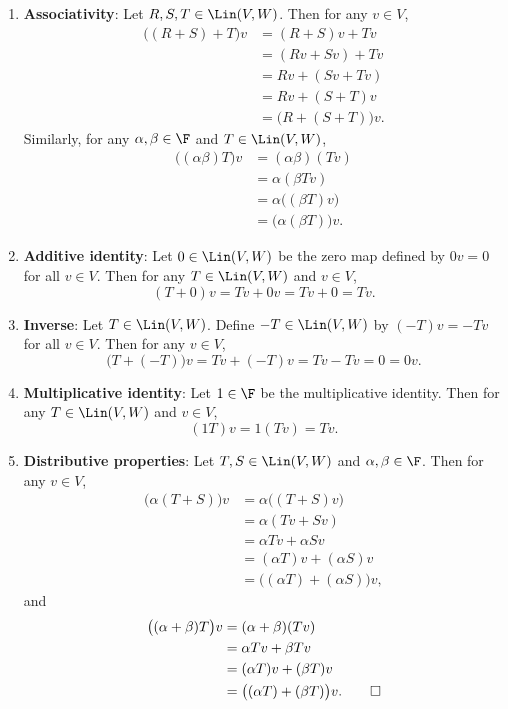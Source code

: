\begin{exc}
\begin{solution}
\begin{enumerate}[label=\arabic*)]
\begin{align*}
    &= (T+S)v.
  \end{align*}
\item \textbf{Associativity}: Let $R,S,T\in\Lin(V,W)$. Then for any $v\in V$,
  \begin{align*}
  \bigl((R+S)+T\bigr)v &= (R+S)v+Tv\\
    &= (Rv+Sv)+Tv\\
    &= Rv+(Sv+Tv)\\
    &= Rv+(S+T)v\\
    &= \bigl(R+(S+T)\bigr)v.
  \end{align*}
  Similarly, for any $\alpha,\beta\in\F$ and $T\in\Lin(V,W)$,
  \begin{align*}
  \bigl((\alpha\beta)T\bigr)v &= (\alpha\beta)(Tv)\\
    &= \alpha(\beta Tv)\\
    &= \alpha\bigl((\beta T)v\bigr)\\
    &= \bigl(\alpha(\beta T)\bigr)v.
  \end{align*}
\item \textbf{Additive identity}: Let $0\in\Lin(V,W)$ be the zero map defined
  by $0v=0$ for all $v\in V$. Then for any $T\in\Lin(V,W)$ and $v\in V$,
  \[ (T+0)v=Tv+0v=Tv+0=Tv. \]
\item \textbf{Inverse}: Let $T\in\Lin(V,W)$. Define $-T\in\Lin(V,W)$ by
  $(-T)v=-Tv$ for all $v\in V$. Then for any $v\in V$,
  \[ \bigl(T+(-T)\bigr)v=Tv+(-T)v=Tv-Tv=0=0v. \]
\item \textbf{Multiplicative identity}: Let $1\in\F$ be the multiplicative
  identity. Then for any $T\in\Lin(V,W)$ and $v\in V$,
  \[ (1T)v=1(Tv)=Tv. \]
\item \textbf{Distributive properties}: Let $T,S\in\Lin(V,W)$ and
  $\alpha,\beta\in\F$. Then for any $v\in V$,
  \begin{align*}
  \bigl(\alpha(T+S)\bigr)v &= \alpha\bigl((T+S)v\bigr)\\
    &= \alpha(Tv+Sv)\\
    &= \alpha Tv+\alpha Sv\\
    &= (\alpha T)v+(\alpha S)v\\
    &= \bigl((\alpha T)+(\alpha S)\bigr)v,
  \end{align*}
  and
  \begin{align*}
  \bigl((\alpha+\beta)T\bigr)v &= (\alpha+\beta)(Tv)\\
    &= \alpha Tv+\beta Tv\\
    &= (\alpha T)v+(\beta T)v\\
    &= \bigl((\alpha T)+(\beta T)\bigr)v. \qedhere
  \end{align*}
\end{enumerate}
\end{solution}


\end{exc}
